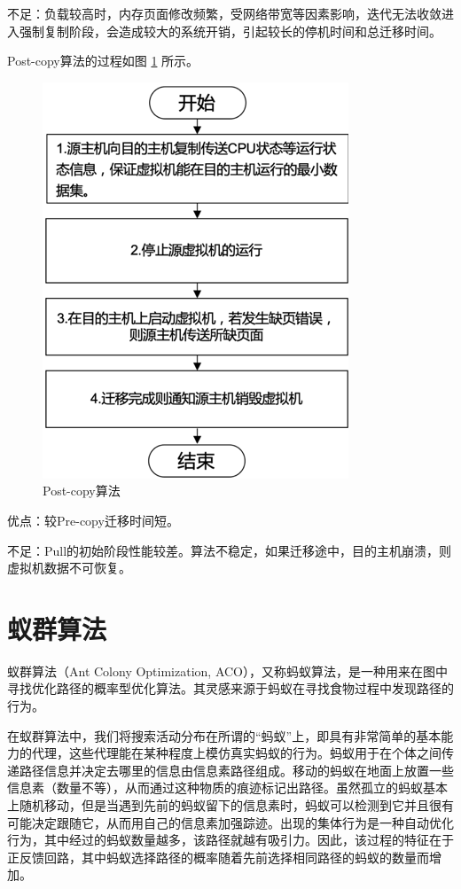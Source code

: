 不足：负载较高时，内存页面修改频繁，受网络带宽等因素影响，迭代无法收敛进入强制复制阶段，会造成较大的系统开销，引起较长的停机时间和总迁移时间。

Post-copy算法的过程如图 \ref{Fig:chap2_3} 所示。

\begin{figure}[htb]
  \centering
  \includegraphics{./Figure/IMG_Chap2_3.png}
  \caption{Post-copy算法}\label{Fig:chap2_3}
\end{figure}

优点：较Pre-copy迁移时间短。

不足：Pull的初始阶段性能较差。算法不稳定，如果迁移途中，目的主机崩溃，则虚拟机数据不可恢复。

\section{蚁群算法}
蚁群算法（Ant Colony Optimization, ACO），又称蚂蚁算法，是一种用来在图中寻找优化路径的概率型优化算法。其灵感来源于蚂蚁在寻找食物过程中发现路径的行为\cite{Maniezzo}。

在蚁群算法中，我们将搜索活动分布在所谓的“蚂蚁”上，即具有非常简单的基本能力的代理，这些代理能在某种程度上模仿真实蚂蚁的行为。蚂蚁用于在个体之间传递路径信息并决定去哪里的信息由信息素路径组成。移动的蚂蚁在地面上放置一些信息素（数量不等），从而通过这种物质的痕迹标记出路径。虽然孤立的蚂蚁基本上随机移动，但是当遇到先前的蚂蚁留下的信息素时，蚂蚁可以检测到它并且很有可能决定跟随它，从而用自己的信息素加强踪迹。出现的集体行为是一种自动优化行为，其中经过的蚂蚁数量越多，该路径就越有吸引力。因此，该过程的特征在于正反馈回路，其中蚂蚁选择路径的概率随着先前选择相同路径的蚂蚁的数量而增加。

